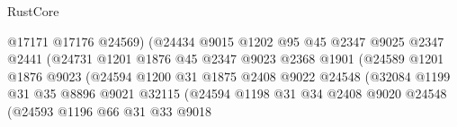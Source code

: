 \begin{lexlean}{RustCore}
\begin{coremodule}
                                        @17171
                                        @17176
                                        @24569)
                                      (@24434
                                        @9015
                                        @1202
                                        @95
                                        @45
                                        @2347
                                        @9025
                                        @2347
                                        @2441
                                        (@24731
                                          @1201
                                          @1876
                                          @45
                                          @2347
                                          @9023
                                          @2368
                                          @1901
                                          (@24589
                                            @1201
                                            @1876
                                            @9023
                                            (@24594
                                              @1200
                                              @31
                                              @1875
                                              @2408
                                              @9022
                                              @24548
                                              (@32084
                                                @1199
                                                @31
                                                @35
                                                @8896
                                                @9021
                                                @32115
                                                (@24594
                                                  @1198
                                                  @31
                                                  @34
                                                  @2408
                                                  @9020
                                                  @24548
                                                  (@24593
                                                    @1196
                                                    @66
                                                    @31
                                                    @33
                                                    @9018

\end{coremodule}
\end{lexlean}
